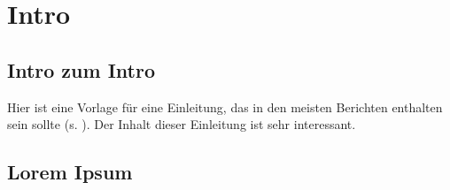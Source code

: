 \chapter{Intro}

\section{Intro zum Intro}

Hier ist eine Vorlage für eine Einleitung, das in den meisten Berichten enthalten sein sollte (s. \cite{knuth84}).
Der Inhalt dieser Einleitung ist sehr interessant.

\section{Lorem Ipsum}

\lipsum